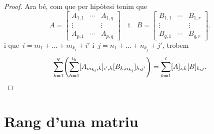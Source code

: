 \documentclass[../../main.tex]{subfiles}
\begin{document}
\begin{proposition}
\begin{proof}
			Ara bé, com que per hipòtesi tenim que
			\[A=\left[\begin{matrix}
			A_{1,1} & \cdots & A_{1,q} \\
			\vdots & & \vdots \\
			A_{p,1} & \cdots & A_{p,q}
			\end{matrix}\right]\quad\text{i}\quad B=\left[\begin{matrix}
			B_{1,1} & \cdots & B_{1,r} \\
			\vdots & & \vdots \\
			B_{q,1} & \cdots & B_{q,r}
			\end{matrix}\right].\]
			i que~\(i=m_{1}+\dots+m_{k_{i}}+i'\) i~\(j=n_{1}+\dots+n_{k_{j}}+j'\), trobem
			\[
			    \sum_{k=1}^{q}\left(\sum_{h=1}^{l_{k}}[A_{m_{k_{i}},k}]_{i',h}[B_{k,n_{k_{j}}}]_{h,j'}\right)=\sum_{k=1}^{l}[A]_{i,k}[B]_{k,j}.\qedhere
			\]
		\end{proof}
	\end{proposition}
\section{Rang d'una matriu}
\end{document}
